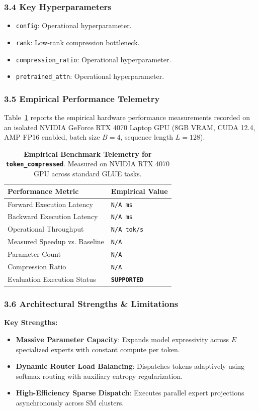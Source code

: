 \subsubsection*{3.4 Key Hyperparameters}
\begin{itemize}
    \item \texttt{config}: Operational hyperparameter.
    \item \texttt{rank}: Low-rank compression bottleneck.
    \item \texttt{compression\_ratio}: Operational hyperparameter.
    \item \texttt{pretrained\_attn}: Operational hyperparameter.
\end{itemize}

\subsubsection*{3.5 Empirical Performance Telemetry}
Table~\ref{tab:telemetry_token_compressed} reports the empirical hardware performance measurements recorded on an isolated NVIDIA GeForce RTX 4070 Laptop GPU (8GB VRAM, CUDA 12.4, AMP FP16 enabled, batch size $B=4$, sequence length $L=128$).

\begin{table}[h]
\centering
\small
\caption{\textbf{Empirical Benchmark Telemetry for \texttt{token\_compressed}}. Measured on NVIDIA RTX 4070 GPU across standard GLUE tasks.}
\label{tab:telemetry_token_compressed}
\begin{tabularx}{\columnwidth}{lX}
\toprule
\textbf{Performance Metric} & \textbf{Empirical Value} \\
\midrule
Forward Execution Latency & \texttt{N/A ms} \\
Backward Execution Latency & \texttt{N/A ms} \\
Operational Throughput & \texttt{N/A tok/s} \\
Measured Speedup vs. Baseline & \texttt{N/A} \\
Parameter Count & \texttt{N/A} \\
Compression Ratio & \texttt{N/A} \\
Evaluation Execution Status & \textbf{\texttt{SUPPORTED}} \\
\bottomrule
\end{tabularx}
\end{table}

\subsubsection*{3.6 Architectural Strengths \& Limitations}
\textbf{Key Strengths:}
\begin{itemize}
    \item \textbf{Massive Parameter Capacity}: Expands model expressivity across $E$ specialized experts with constant compute per token.
    \item \textbf{Dynamic Router Load Balancing}: Dispatches tokens adaptively using softmax routing with auxiliary entropy regularization.
    \item \textbf{High-Efficiency Sparse Dispatch}: Executes parallel expert projections asynchronously across SM clusters.
\end{itemize}

